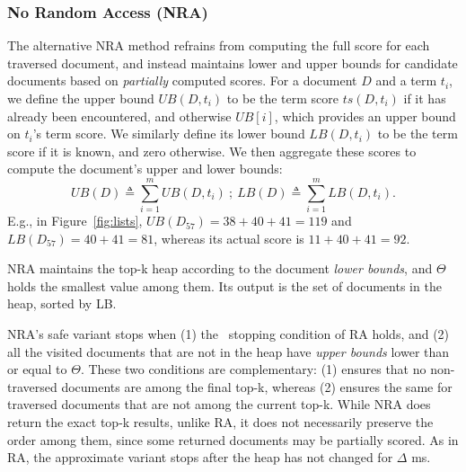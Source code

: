 \subsubsection{No Random Access (NRA)} 
The alternative NRA method %
refrains from computing the full score for each traversed document, and instead
maintains lower and upper bounds for candidate documents based on {\em partially\/} computed scores. 
For a document $D$ and a term $t_i$, we define the upper bound $UB(D, t_i)$ to be the term score $ts(D, t_i)$ if it has already been encountered, and otherwise $UB[i]$, which provides an upper bound on $t_i$'s term score. We similarly define its lower bound $LB(D, t_i)$ to be the term score if it is known, and zero otherwise. We then aggregate these scores to compute the document's upper and lower bounds:
\[
UB(D) \triangleq \sum_{i=1}^m UB(D, t_i) \ ; \  
LB(D) \triangleq \sum_{i=1}^m LB(D, t_i).
\] 
E.g., in Figure~\ref{fig:lists}, $UB(D_{57}) = 38+40+41 = 119$ and $LB(D_{57}) = 40+41 = 81$, whereas its actual score  is $11+ 40+41 = 92$.

NRA maintains the top-k heap according to the document \emph{lower bounds}, and $\Theta$ holds the smallest value among them. 
Its output is the set of documents in the heap, sorted by LB.

NRA's safe variant stops when (1) the \RAStop\ stopping condition of RA holds, 
and (2) all the  visited documents that are not in the heap have \emph{upper bounds} lower than or equal to $\Theta$. These two conditions are complementary: (1) ensures that no non-traversed documents are among the final top-k, whereas (2) ensures the same for  traversed documents that are not among the current top-k. 
While NRA does return the exact top-k results, unlike RA, it does not necessarily preserve the order among them, since some returned documents may be partially scored. As in RA, the approximate variant  stops after the heap has not changed for $\Delta$ ms.

